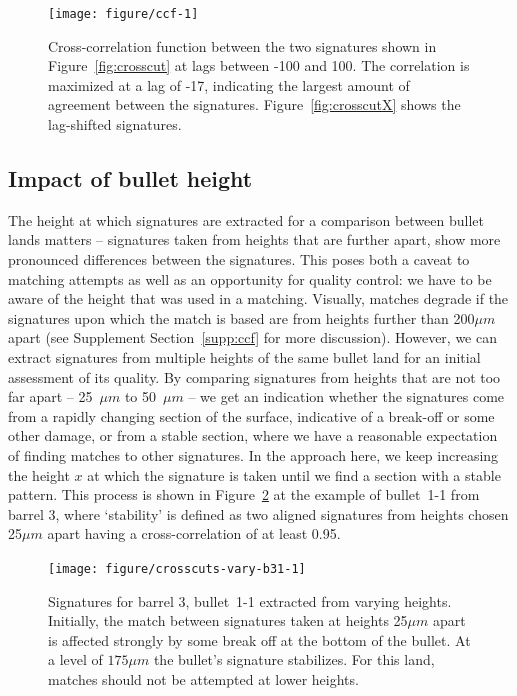 \documentclass[aoas, preprint]{imsart}\usepackage[]{graphicx}\usepackage[]{color}
\newenvironment{knitrout}{}{} %
\begin{document}
\begin{figure}[hbtp]
  \centering
\begin{knitrout}
\color{fgcolor}
\texttt{[image: figure/ccf-1]} 

\end{knitrout}
\caption{\label{fig:ccf}Cross-correlation function between the two signatures shown in Figure~\ref{fig:crosscut} at lags between -100 and 100. The correlation is maximized at a lag of -17, indicating the largest amount of agreement between the signatures. Figure~\ref{fig:crosscutX} shows the lag-shifted signatures.}
\end{figure}


\subsection{Impact of bullet height}\label{sec:heights}
The height at which signatures are extracted for a comparison between bullet lands matters -- signatures taken from heights that are further apart, show more pronounced differences between the signatures. 
This poses both a caveat to matching attempts as well as an opportunity for quality control: we have to be aware of the height that was used in a matching. Visually, matches degrade if the signatures upon which the match is based are from heights further than 200$\mu m$ apart  (see Supplement Section~\ref{supp:ccf} for more discussion). However, we can extract signatures from multiple heights of the same bullet land for an initial assessment of its quality. By comparing signatures from heights that are not too far apart --  25~$\mu m$ to 50~$\mu m$ -- we get an indication whether the signatures come from a rapidly changing section of the surface, indicative of a break-off or some other damage, or from a stable section, where we have a reasonable expectation of finding matches to other signatures. In the approach here, we keep increasing the height $x$ at which the signature is taken until we find a section with a stable pattern. This process is shown in Figure~\ref{fig:crosscuts2} at the example of bullet~1-1 from barrel 3, where `stability' is  defined as two aligned signatures from heights chosen 25$\mu m$ apart having a cross-correlation of at least 0.95. 

\begin{figure}[hbtp]
  \centering
\begin{knitrout}
\color{fgcolor}
\texttt{[image: figure/crosscuts-vary-b31-1]} 

\end{knitrout}
\caption{\label{fig:crosscuts2}Signatures  for barrel 3, bullet~1-1 extracted from varying heights. Initially, the match between signatures taken at heights 25$\mu m$ apart is affected strongly by some break off at the bottom of the bullet. At a  level of $175\mu m$ the bullet's signature stabilizes. For this land, matches should not be attempted at lower heights. }
\end{figure}
\end{document}
